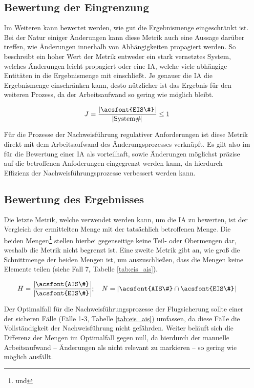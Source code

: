 \pagebreak
\subsection{Bewertung der Eingrenzung}
    
    Im Weiteren kann bewertet werden, wie gut die Ergebnismenge eingeschränkt ist.
    Bei der Natur einiger Änderungen kann diese Metrik auch eine Aussage darüber treffen, wie Änderungen innerhalb von Abhängigkeiten propagiert werden. 
    So beschreibt ein hoher Wert der Metrik entweder ein stark vernetztes System, welches Änderungen leicht propagiert oder eine \ac{IA}, welche viele abhängige Entitäten in die Ergebnismenge mit einschließt.
    Je genauer die \ac{IA} die Ergebnismenge einschränken kann, desto nützlicher ist das Ergebnis für den weiteren Prozess, da der Arbeitsaufwand so gering wie möglich bleibt. 
    
    $$
        J = \dfrac{|\text{\acsfont{EIS\#}}|}{|\text{System\#}|} \leq 1
    $$
    
    Für die Prozesse der Nachweisführung regulativer Anforderungen ist diese Metrik direkt mit dem Arbeitsaufwand des Änderungsprozesses verknüpft.
    Es gilt also im für die Bewertung einer \ac{IA} als vorteilhaft, sowie Änderungen möglichst präzise auf die betroffenen Anfoderungen eingegrenzt werden kann, da hierdurch Effizienz der Nachweisführungsprozesse verbessert werden kann.
    
    

\subsection{Bewertung des Ergebnisses}
    
    Die letzte Metrik, welche verwendet werden kann, um die \ac{IA} zu bewerten, ist der Vergleich der ermittelten Menge mit der tatsächlich betroffenen Menge.
    Die beiden Mengen\footnote{ und } stellen hierbei gegenseitige keine Teil- oder Obermengen dar, weshalb die Metrik nicht begrenzt ist.
    Eine zweite Metrik gibt an, wie groß die Schnittmenge der beiden Mengen ist, um auszuschließen, dass die Mengen keine Elemente teilen (siehe Fall 7, Tabelle \ref{tab:eis_ais}). 
    
    $$
        H = \dfrac{|\text{\acsfont{AIS\#}}|}{|\text{\acsfont{EIS\#}}|}; \quad
        N = |\acsfont{AIS\#} \cap \acsfont{EIS\#}|
    $$
    
    Der Optimalfall für die Nachweisführungsprozesse der Flugsicherung sollte einer der sicheren Fälle (Fälle 1-3, Tabelle \ref{tab:eis_ais}) umfassen, da diese Fälle die Vollständigkeit der Nachweisführung nicht gefährden.
    Weiter beläuft sich die Differenz der Mengen im Optimalfall gegen null, da hierdurch der manuelle Arbeitsaufwand -- Änderungen als nicht relevant zu markieren -- so gering wie möglich ausfällt.
    \bigskip
    
    
